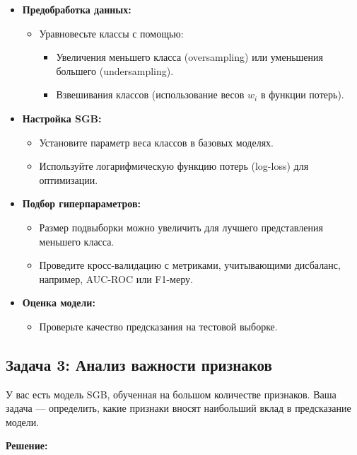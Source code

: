 \begin{itemize}
    \item \textbf{Предобработка данных:}
    \begin{itemize}
        \item Уравновесьте классы с помощью:
        \begin{itemize}
            \item Увеличения меньшего класса (oversampling) или уменьшения большего (undersampling).
            \item Взвешивания классов (использование весов $w_i$ в функции потерь).
        \end{itemize}
    \end{itemize}
    \item \textbf{Настройка SGB:}
    \begin{itemize}
        \item Установите параметр веса классов в базовых моделях.
        \item Используйте логарифмическую функцию потерь (log-loss) для оптимизации.
    \end{itemize}
    \item \textbf{Подбор гиперпараметров:}
    \begin{itemize}
        \item Размер подвыборки можно увеличить для лучшего представления меньшего класса.
        \item Проведите кросс-валидацию с метриками, учитывающими дисбаланс, например, AUC-ROC или F1-меру.
    \end{itemize}
    \item \textbf{Оценка модели:}
    \begin{itemize}
        \item Проверьте качество предсказания на тестовой выборке.
    \end{itemize}
\end{itemize}

\subsection{Задача 3: Анализ важности признаков}

У вас есть модель SGB, обученная на большом количестве признаков. Ваша задача — определить, какие признаки вносят наибольший вклад в предсказание модели.

\textbf{Решение:}

